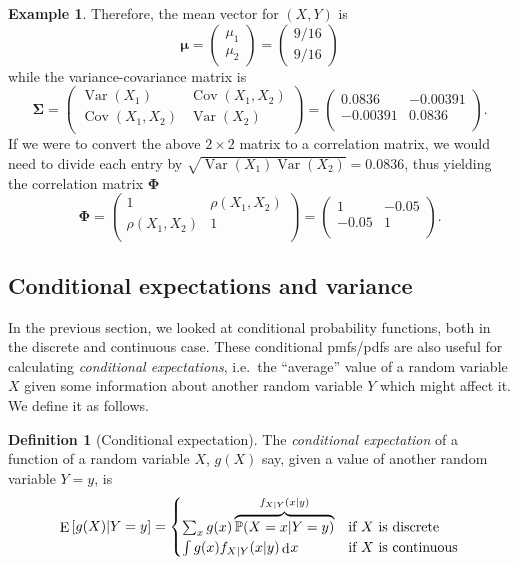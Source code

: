 \documentclass[
]{book}
\newcommand{\bmu}{{\boldsymbol\mu}}
\newcommand{\bSigma}{{\boldsymbol\Sigma}}
\newcommand{\bPhi}{{\boldsymbol\Phi}}
\DeclareMathOperator{\E}{E}
\DeclareMathOperator{\Var}{Var}
\DeclareMathOperator{\Cov}{Cov}
\newcommand{\bbP}{\mathbb{P}}
\DeclareMathOperator{\dd}{d}
\newcommand{\dint}{\dd\hspace{0.5pt}\!}
\theoremstyle{definition}
\newtheorem{definition}{Definition}[chapter]
\theoremstyle{definition}
\newtheorem{example}{Example}[chapter]
\theoremstyle{definition}
\theoremstyle{definition}
\theoremstyle{remark}
\begin{document}
\begin{example}
Therefore, the mean vector for \((X,Y)\) is
\[
\bmu = \begin{pmatrix}
\mu_1\\
\mu_2
\end{pmatrix}
=
\begin{pmatrix}
9/16 \\
9/16
\end{pmatrix}
\]
while the variance-covariance matrix is
\[
\bSigma = \begin{pmatrix}
\Var(X_1) & \Cov(X_1,X_2) \\
\Cov(X_1,X_2) & \Var(X_2) \\
\end{pmatrix} 
=
\begin{pmatrix}
0.0836 & -0.00391 \\
-0.00391 & 0.0836 \\
\end{pmatrix}.
\]
If we were to convert the above \(2\times 2\) matrix to a correlation matrix, we would need to divide each entry by \(\sqrt{\Var(X_1)\Var(X_2)}=0.0836\), thus yielding the correlation matrix \(\bPhi\)
\[
\bPhi = \begin{pmatrix}
1 & \rho(X_1,X_2) \\
\rho(X_1,X_2) & 1 \\
\end{pmatrix} 
=
\begin{pmatrix}
1 & -0.05 \\
-0.05 & 1 \\
\end{pmatrix}.
\]
\end{example}

\hypertarget{conditional-expectations-and-variance}{%
\subsection{Conditional expectations and variance}\label{conditional-expectations-and-variance}}

In the previous section, we looked at conditional probability functions, both in the discrete and continuous case.
These conditional pmfs/pdfs are also useful for calculating \emph{conditional expectations}, i.e.~the ``average'' value of a random variable \(X\) given some information about another random variable \(Y\) which might affect it.
We define it as follows.

\begin{definition}[Conditional expectation]
The \emph{conditional expectation} of a function of a random variable \(X\), \(g(X)\) say, given a value of another random variable \(Y=y\), is
\[
\E\left[g(X)|Y=y\right] =
\begin{cases}
\sum_x g(x)\overbrace{\bbP(X=x|Y=y)}^{f_{X|Y}(x|y)} &\text{if $X$ is discrete}\\
\int g(x)f_{X|Y}(x|y)\dint x &\text{if $X$ is continuous}\\
\end{cases}
\]
\end{definition}
\end{document}
